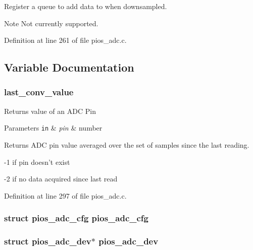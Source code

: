 Register a queue to add data to when downsampled. 

\begin{DoxyNote}{Note}
Not currently supported. 
\end{DoxyNote}


Definition at line 261 of file pios\-\_\-adc.\-c.



\subsection{Variable Documentation}
\hypertarget{group___p_i_o_s___a_d_c_ga093162eccbf300ef9e9fe2cfd9d956f6}{
\subsubsection[{last\-\_\-conv\-\_\-value}]{ last\-\_\-conv\-\_\-value}}\label{group___p_i_o_s___a_d_c_ga093162eccbf300ef9e9fe2cfd9d956f6}
Returns value of an A\-D\-C Pin 
\begin{DoxyParams}[1]{Parameters}
\mbox{\tt in}  & {\em pin} & number \\
\hline
\end{DoxyParams}
\begin{DoxyReturn}{Returns}
A\-D\-C pin value averaged over the set of samples since the last reading. 

-\/1 if pin doesn't exist 

-\/2 if no data acquired since last read 
\end{DoxyReturn}


Definition at line 297 of file pios\-\_\-adc.\-c.

\hypertarget{group___p_i_o_s___a_d_c_ga14da091ebda49e985ec01bc39f918eed}{
\subsubsection[{pios\-\_\-adc\-\_\-cfg}]{\setlength{\rightskip}{0pt plus 5cm}struct {\bf pios\-\_\-adc\-\_\-cfg} {\bf pios\-\_\-adc\-\_\-cfg}}}\label{group___p_i_o_s___a_d_c_ga14da091ebda49e985ec01bc39f918eed}
\hypertarget{group___p_i_o_s___a_d_c_gab32db3584e1b8779726fcabc7aa2dc9a}{
\subsubsection[{pios\-\_\-adc\-\_\-dev}]{\setlength{\rightskip}{0pt plus 5cm}struct {\bf pios\-\_\-adc\-\_\-dev}$\ast$ {\bf pios\-\_\-adc\-\_\-dev}}}\label{group___p_i_o_s___a_d_c_gab32db3584e1b8779726fcabc7aa2dc9a}


